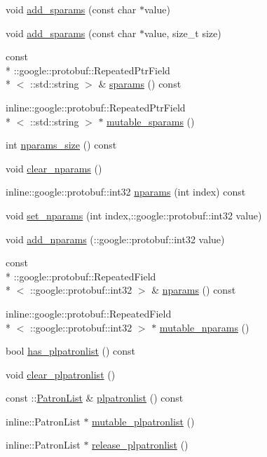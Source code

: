 \begin{DoxyCompactItemize}
\item 
void \hyperlink{classRequest_a840ac7e6e8eae7530b37925f1705253d}{add\-\_\-sparams} (const char $\ast$value)
\item 
void \hyperlink{classRequest_a46b9a69ef34f0e6a0a2ca43b2fcf58d5}{add\-\_\-sparams} (const char $\ast$value, size\-\_\-t size)
\item 
const \\*
\-::google\-::protobuf\-::\-Repeated\-Ptr\-Field\\*
$<$ \-::std\-::string $>$ \& \hyperlink{classRequest_a5b55c98c0f185b5092542b5f695be9ea}{sparams} () const 
\item 
inline\-::google\-::protobuf\-::\-Repeated\-Ptr\-Field\\*
$<$ \-::std\-::string $>$ $\ast$ \hyperlink{classRequest_aaefbe248343ddf5affa9a6678074688c}{mutable\-\_\-sparams} ()
\item 
int \hyperlink{classRequest_a0ac5187c39c144c375c5d720b968d644}{nparams\-\_\-size} () const 
\item 
void \hyperlink{classRequest_af29da518c2178d582a5380660b9f877c}{clear\-\_\-nparams} ()
\item 
inline\-::google\-::protobuf\-::int32 \hyperlink{classRequest_a4c445d8970668865588848f6346326af}{nparams} (int index) const 
\item 
void \hyperlink{classRequest_a639e07bce8895ce93c235c4536fd12c7}{set\-\_\-nparams} (int index,\-::google\-::protobuf\-::int32 value)
\item 
void \hyperlink{classRequest_a3bc3e24eafd3dad05036f416e4f722a1}{add\-\_\-nparams} (\-::google\-::protobuf\-::int32 value)
\item 
const \\*
\-::google\-::protobuf\-::\-Repeated\-Field\\*
$<$ \-::google\-::protobuf\-::int32 $>$ \& \hyperlink{classRequest_aece42bd20553af8f789ff463c37760a3}{nparams} () const 
\item 
inline\-::google\-::protobuf\-::\-Repeated\-Field\\*
$<$ \-::google\-::protobuf\-::int32 $>$ $\ast$ \hyperlink{classRequest_a2c30b6de2276f4a032d48d19ab127839}{mutable\-\_\-nparams} ()
\item 
bool \hyperlink{classRequest_ace539f914a0b5aec809abdafef6b05e3}{has\-\_\-plpatronlist} () const 
\item 
void \hyperlink{classRequest_a607747b563b081c4c92780843f9290cd}{clear\-\_\-plpatronlist} ()
\item 
const \-::\hyperlink{classPatronList}{Patron\-List} \& \hyperlink{classRequest_aadce82c40e48ce467fec51e59edb375d}{plpatronlist} () const 
\item 
inline\-::\-Patron\-List $\ast$ \hyperlink{classRequest_a0a99c3b93c8fbda5f8c5a19b87d48506}{mutable\-\_\-plpatronlist} ()
\item 
inline\-::\-Patron\-List $\ast$ \hyperlink{classRequest_a9ac13ac3db291b9b31d2df4444ee148d}{release\-\_\-plpatronlist} ()
\end{DoxyCompactItemize}
